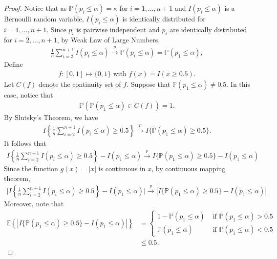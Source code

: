 \documentclass[11pt]{article}
\def\E{\mathbb{E}} %
\def\P{\mathbb{P}}
\theoremstyle{definition}
\begin{document}
\begin{proof}
Notice that as $\P(p_i \leq \alpha)=\kappa$ for $i = 1, \ldots, n+1$ and $I(p_i \leq  \alpha) $ is a Bernoulli random variable, $I(p_i \leq  \alpha)$ is identically distributed for  $i = 1, \ldots, n+1$. Since $p_i$ is pairwise independent and $p_i$ are identically distributed for $i = 2, \ldots, n+1$, by Weak Law of Large Numbers, 
\begin{align*}
  \frac{1}{n}\sum_{i=2}^{n+1}I(p_i \leq  \alpha)  
   \stackrel{p}{\rightarrow}  \P(p_i \leq \alpha) = \P(p_1 \leq \alpha),
\end{align*}
Define
\begin{align*}
  f \colon [0,1] \mapsto \{0,1\} 
  \text{ with }
  f(x) = I(x \geq 0.5).
\end{align*}
Let $C(f)$ denote the continuity set of $f$. Suppose that $\P(p_1 \leq  \alpha) \neq 0.5$. In this case, notice that 
\begin{align*}
  \P(\P(p_1 \leq  \alpha) \in C(f)) =1.
\end{align*}
By Slutsky's Theorem, we have
\begin{align*}
  I\left\{\frac{1}{n}\sum_{i=2}^{n+1}I(p_i \leq  \alpha) \geq 0.5\right\}
  \stackrel{p}{\rightarrow} 
  I\{ \P(p_1 \leq  \alpha) \geq 0.5\}.
\end{align*}
It follows that
\begin{align*}
   I\left\{\frac{1}{n}\sum_{i=2}^{n+1}I(p_i \leq  \alpha) \geq 0.5\right\}- I( p_1 \leq  \alpha) 
  \stackrel{p}{\rightarrow} 
  I\{ \P(p_1 \leq  \alpha) \geq 0.5\} - I( p_1 \leq  \alpha) 
\end{align*}
Since the function $g(x)= |x|$ is continuous in $x$,  by continuous mapping theorem, 
\begin{align*}
  \bigg|  I\left\{\frac{1}{n}\sum_{i=2}^{n+1}I(p_i \leq  \alpha) \geq 0.5\right\}
  - I( p_1 \leq  \alpha) \bigg| \stackrel{p}{\rightarrow}   |I\{ \P(p_1 \leq  \alpha) \geq 0.5\}
  - I( p_1 \leq  \alpha) |
\end{align*}
Moreover, note that
\begin{align*}
\E \left\{ |I\{ \P(p_1 \leq  \alpha) \geq 0.5\}
  - I( p_1 \leq  \alpha) |\right\}
  & = \begin{cases}
    1- \P(p_1 \leq \alpha) & \text{ if } \P(p_1 \leq \alpha) > 0.5 \\
    \P(p_1 \leq \alpha) & \text{ if } \P(p_1 \leq \alpha) < 0.5 
  \end{cases} \\
  & \leq  0.5.
\end{align*}

\end{proof}
\end{document}
